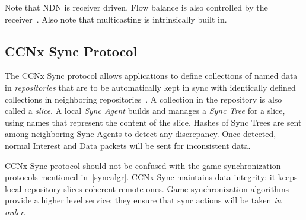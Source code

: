 Note that NDN is receiver driven. Flow balance is also controlled by the receiver~\cite{Zact}. Also note that multicasting is intrinsically built in.

\subsection{CCNx Sync Protocol}
\label{ccnsync}

The CCNx Sync protocol allows applications to define collections of named data in \emph{repositories} that are to be automatically kept in sync with identically defined collections in neighboring repositories~\cite{CCNxSync}. A collection in the repository is also called a \emph{slice}. A local \emph{Sync Agent} builds and manages a \emph{Sync Tree} for a slice, using names that represent the content of the slice. Hashes of Sync Trees are sent among neighboring Sync Agents to detect any discrepancy. Once detected, normal Interest and Data packets will be sent for inconsistent data.

CCNx Sync protocol should not be confused with the game synchronization protocols mentioned in~\ref{syncalgr}. CCNx Sync maintains data integrity: it keeps local repository slices coherent remote ones. Game synchronization algorithms provide a higher level service: they ensure that sync actions will be taken \emph{in order}.

